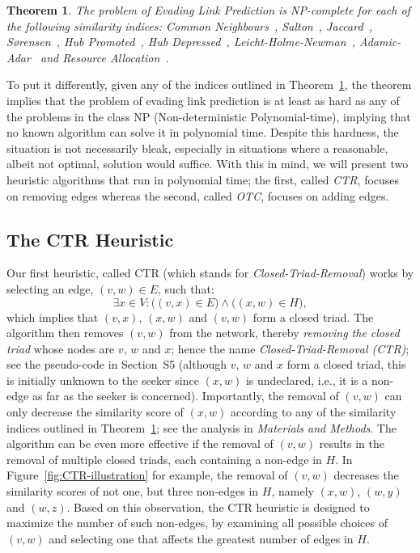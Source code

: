 \documentclass[twocolumn]{article}
\newtheorem{theorem}{Theorem}
\newcommand{\Hide}{H}
\begin{document}
\begin{theorem}
\label{theorem:NPcompleteness}
The problem of Evading Link Prediction is NP-complete for each of the following similarity indices:
Common Neighbours~\cite{newman2001clustering}, Salton~\cite{salton1986introduction}, Jaccard~\cite{jaccard1901etude}, S{\o}rensen~\cite{sorensen1948method}, Hub Promoted~\cite{ravasz2002hierarchical}, Hub Depressed~\cite{ravasz2002hierarchical}, Leicht-Holme-Newman~\cite{leicht2006vertex}, Adamic-Adar~\cite{adamic2003friends} and Resource Allocation~\cite{zhou2009predicting}.
\end{theorem}

To put it differently, given any of the indices outlined in Theorem~\ref{theorem:NPcompleteness}, the theorem implies that the problem of evading link prediction is at least as hard as any of the problems in the class NP (Non-deterministic Polynomial-time), implying that no known algorithm can solve it in polynomial time. Despite this hardness, the situation is not necessarily bleak, especially in situations where a reasonable, albeit not optimal, solution would suffice. With this in mind, we will present two heuristic algorithms that run in polynomial time; the first, called \emph{CTR}, focuses on removing edges whereas the second, called \emph{OTC}, focuses on adding edges.

\subsection*{The CTR Heuristic}
\label{sec:CTRheuristic}

Our first heuristic, called CTR (which stands for \textit{Closed-Triad-Removal}) works by selecting an edge, $(v,w)\in E$, such that:
$$
\exists x\in V: \big((v,x)\in E\big) \wedge \big((x,w)\in\Hide\big),
$$
which implies that $(v,x)$, $(x,w)$ and $(v,w)$ form a closed triad. The algorithm then removes $(v,w)$ from the network, thereby \emph{removing the closed triad} whose nodes are $v$, $w$ and $x$; hence the name \textit{Closed-Triad-Removal (CTR)}; see the pseudo-code in Section~S5 (although $v$, $w$ and $x$ form a closed triad, this is initially unknown to the seeker since $(x,w)$ is undeclared, i.e., it is a non-edge as far as the seeker is concerned). Importantly, the removal of $(v,w)$ can only decrease the similarity score of $(x,w)$ according to any of the similarity indices outlined in Theorem~\ref{theorem:NPcompleteness}; see the analysis in \emph{Materials and Methods}. The algorithm can be even more effective if the removal of $(v,w)$ results in the removal of multiple closed triads, each containing a non-edge in $H$. In Figure~\ref{fig:CTR-illustration} for example, the removal of $(v,w)$ decreases the similarity scores of not one, but three non-edges in $\Hide$, namely $(x,w)$, $(w,y)$ and $(w,z)$. Based on this observation, the CTR heuristic is designed to maximize the number of such non-edges, by examining all possible choices of $(v,w)$ and selecting one that affects the greatest number of edges in $\Hide$. 
\end{document}
